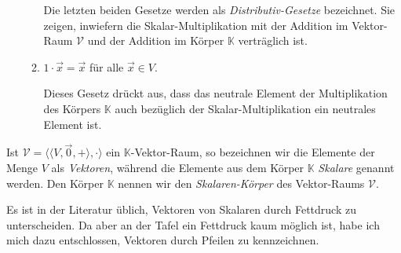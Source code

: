 \begin{Definition}
\begin{enumerate}
\begin{enumerate}
            Die letzten beiden Gesetze werden als {\emph{\color{blue}Distributiv-Gesetze}}
            bezeichnet.  Sie zeigen, inwiefern die Skalar-Multiplikation mit der Addition im Vektor-Raum
            $\mathcal{V}$ und der Addition im K\"{o}rper $\mathbb{K}$ vertr\"{a}glich ist.
      \item $1 \cdot \vec{x} = \vec{x}$ \quad f\"ur alle $\vec{x} \in V$.  

            Dieses Gesetz dr\"{u}ckt aus, dass das neutrale Element der Multiplikation des K\"{o}rpers
            $\mathbb{K}$ auch bez\"{u}glich der Skalar-Multiplikation ein neutrales Element ist. 
      \end{enumerate}
\end{enumerate} 
Ist $\mathcal{V} = \bigl\langle \langle V, \vec{0}, + \rangle, \cdot \bigr\rangle$  ein $\mathbb{K}$-Vektor-Raum, so bezeichnen wir die Elemente der Menge
$V$ als {\emph{\color{blue}Vektoren}}, w\"{a}hrend die Elemente aus dem K\"{o}rper $\mathbb{K}$ 
{\emph{\color{blue}Skalare}} genannt werden.  Den K\"{o}rper $\mathbb{K}$ nennen wir den
{\emph{\color{blue}Skalaren-K\"{o}rper}} des Vektor-Raums $\mathcal{V}$.  
\eoxs
\end{Definition}

\remark
Es ist in der Literatur \"{u}blich, Vektoren von Skalaren durch Fettdruck zu unterscheiden.  
Da aber an der Tafel ein Fettdruck kaum m\"{o}glich ist, habe ich mich dazu entschlossen, 
Vektoren durch Pfeilen zu kennzeichnen.
\eoxs


